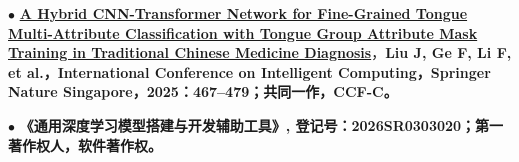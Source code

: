 \documentclass[11pt,a4paper,fontset=none]{ctexart}
\newcommand{\entrytitle}[1]{{\textbf{#1}}}
\begin{document}
\par\noindent
$\bullet$ \href{https://doi.org/10.1007/978-981-96-9891-2_39}{\entrytitle{A Hybrid CNN-Transformer Network for Fine-Grained Tongue Multi-Attribute Classification with Tongue Group Attribute Mask Training in Traditional Chinese Medicine Diagnosis}}，\entrytitle{Liu J, Ge F, Li F, et al.，International Conference on Intelligent Computing，Springer Nature Singapore，2025：467--479；共同一作，CCF-C。}


\par\noindent
$\bullet$  \entrytitle{《通用深度学习模型搭建与开发辅助工具》, 登记号：2026SR0303020；第一著作权人，软件著作权。}
\end{document}
